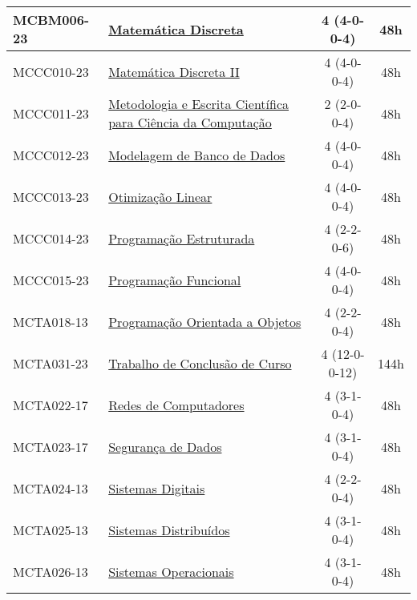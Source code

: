 \begin{table}[h!]
\begin{tabular}{|l|p{}|c|c|}
        MCBM006-23 & \hyperref[disc:mdI]{Matemática Discreta} & 4 (4-0-0-4) & 48h \\
        \hline
        MCCC010-23 & \hyperref[disc:mdII]{Matemática Discreta II} & 4 (4-0-0-4) & 48h \\
        \hline
        MCCC011-23 & \hyperref[disc:metod]{Metodologia e Escrita Científica para Ciência da Computação} & 2 (2-0-0-4) & 48h \\
        \hline
        MCCC012-23 & \hyperref[disc:mbd]{Modelagem de Banco de Dados} & 4 (4-0-0-4) & 48h \\
        \hline
        MCCC013-23 & \hyperref[disc:ol]{Otimização Linear} & 4 (4-0-0-4) & 48h \\
        \hline
        MCCC014-23 & \hyperref[disc:pe]{Programação Estruturada} & 4 (2-2-0-6) & 48h \\
        \hline
        MCCC015-23 & \hyperref[disc:pf]{Programação Funcional} & 4 (4-0-0-4) & 48h \\
        \hline
        MCTA018-13 & \hyperref[disc:poo]{Programação Orientada a Objetos} & 4 (2-2-0-4) & 48h \\
        \hline
        MCTA031-23 & \hyperref[disc:tccIII]{Trabalho de Conclusão de Curso} & 4 (12-0-0-12) & 144h \\
        \hline
        MCTA022-17 & \hyperref[disc:redes]{Redes de Computadores} & 4 (3-1-0-4) & 48h \\
        \hline
        MCTA023-17 & \hyperref[disc:seg]{Segurança de Dados} & 4 (3-1-0-4) & 48h \\
        \hline
        MCTA024-13 & \hyperref[disc:sist_dig]{Sistemas Digitais} & 4 (2-2-0-4) & 48h \\
        \hline
        MCTA025-13 & \hyperref[disc:sist_distr]{Sistemas Distribuídos} & 4 (3-1-0-4) & 48h \\
        \hline
        MCTA026-13 & \hyperref[disc:so]{Sistemas Operacionais} & 4 (3-1-0-4) & 48h\\
        \hline
    \end{tabular}
\end{table}


